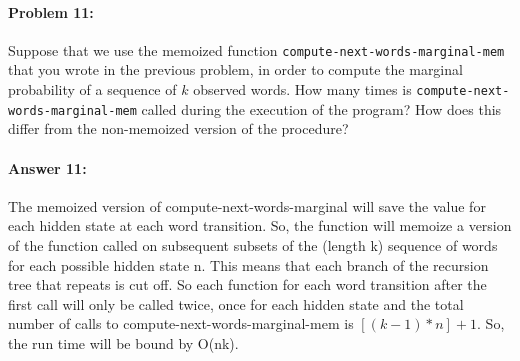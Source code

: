 \documentclass[10pt]{article}
\begin{document}
\hrulefill
\paragraph{Problem 11:}
Suppose that we use the memoized function
\texttt{compute-next-words-marginal-mem} that you wrote in the
previous problem, in order to compute the marginal probability of a
sequence of $k$ observed words. How many times is
\texttt{compute-next-words-marginal-mem} called during the execution
of the program? How does this differ from the non-memoized version of
the procedure?


\paragraph{Answer 11:} The memoized version of compute-next-words-marginal will save the value for each hidden state at each word transition. So, the function will memoize a version of the function called on subsequent subsets of the (length k) sequence of words for each possible hidden state n. This means that each branch of the recursion tree that repeats is cut off. So each function for each word transition after the first call will only be called twice, once for each hidden state and the total number of calls to compute-next-words-marginal-mem is $[ (k-1) *  n ] + 1$. So, the run time will be bound by O(nk).
\end{document}
